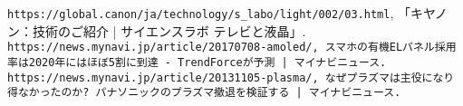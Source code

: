 \documentclass[uplatex]{jsarticle} %
\begin{document}
\begin{thebibliography}{99}
   \verb+https://global.canon/ja/technology/s_labo/light/002/03.html+, 「キヤノン：技術のご紹介 | サイエンスラボ テレビと液晶」.
   \verb+https://news.mynavi.jp/article/20170708-amoled/, スマホの有機ELパネル採用率は2020年にはほぼ5割に到達 - TrendForceが予測 | マイナビニュース.+
   \verb+https://news.mynavi.jp/article/20131105-plasma/, なぜプラズマは主役になり得なかったのか? パナソニックのプラズマ撤退を検証する | マイナビニュース.+
\end{thebibliography}
\end{document}
